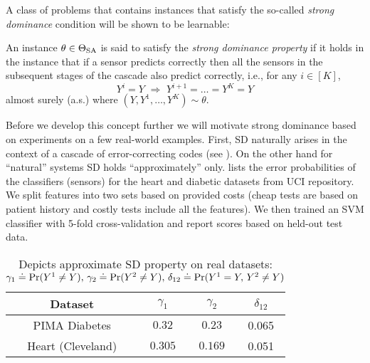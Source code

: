 A class of \ses problems that contains instances that satisfy the so-called \emph{strong dominance} condition 
will be shown to be learnable:
\begin{defi}
An instance $\theta \in \Theta_{\mathrm{SA}}$  is said to satisfy the \emph{strong dominance property} if 
it holds in the instance that if a sensor predicts correctly
then all the sensors in the subsequent stages of the cascade also predict correctly, i.e., 
for any $i\in [K]$,
    \begin{equation}
	\label{eqn:DominanceCondition}
	Y^i=Y \,\, \Rightarrow\,\, Y^{i+1}= \dots =  Y^K = Y
	\end{equation}
	almost surely (a.s.)
	where $(Y,Y^1,\dots,Y^K)\sim \theta$.
\end{defi}
Before we develop this concept further we will motivate strong dominance based on experiments on a few real-world examples. First, SD naturally arises in the context of a cascade of error-correcting codes (see \cite{costello,voyager}). On the other hand for ``natural'' systems SD holds ``approximately'' only.  lists the error probabilities of the classifiers (sensors) for the heart and diabetic datasets from UCI repository. We split features into two sets based on provided costs (cheap tests are based on patient history and costly tests include all the features). We then trained an SVM classifier with 5-fold cross-validation and report scores based on held-out test data. 
\begin{table}[h]
\vspace{-6pt}
\begin{center}
\begin{tabular}[c]{c|c|c|c } 
Dataset & $\gamma_1$ & $\gamma_2$ & $\delta_{12}$\\ \hline \hline
PIMA Diabetes & $0.32 $ & $ 0.23$  & 0.065\\  \hline
Heart (Cleveland) & $0.305$ & $0.169$ &  0.051\\  \hline
\end{tabular}
\end{center}
\caption{\footnotesize Depicts approximate SD property on real datasets: $\gamma_1 \doteq \Pr(Y^1 \neq Y),\,\gamma_2\doteq \Pr(Y^2 \neq Y),\, \delta_{12} \doteq \Pr(Y^1=Y,\, Y^2\neq Y)$ }
\vspace{-13pt}
\label{tab:ErrorTable1}
\end{table}
